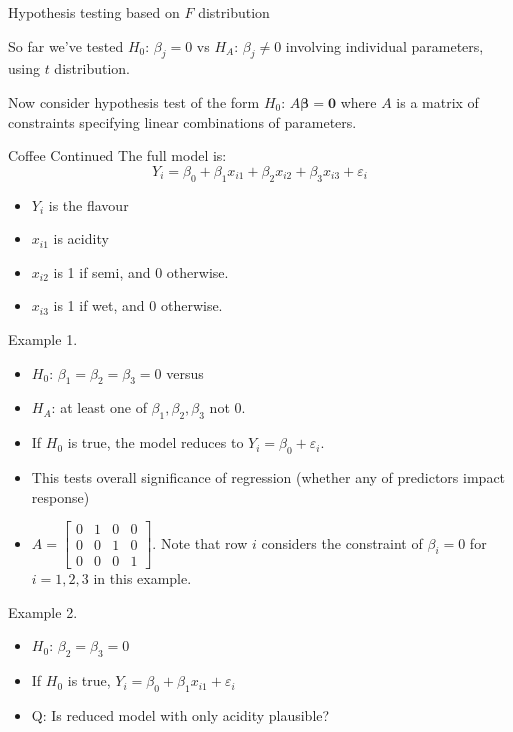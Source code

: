 Hypothesis testing based on $ F $ distribution

So far we've tested $ H_0 $: $ \beta_j=0 $
vs $ H_A $: $ \beta_j\neq 0 $
involving individual parameters,
using $ t $ distribution.

Now consider hypothesis test of the form $ H_0 $: $ A\symbf{\beta}=\symbf{0} $
where $ A $ is a matrix of constraints specifying
linear combinations of parameters.

\begin{Example}{Coffee Continued}{}
    The full model is:
    \[ Y_i=\beta_0+\beta_1x_{i1}+\beta_2x_{i2}+\beta_3x_{i3}+\varepsilon_i \]
    \begin{itemize}
        \item $ Y_i $ is the flavour
        \item $ x_{i1} $ is acidity
        \item $ x_{i2} $ is 1 if semi, and 0 otherwise.
        \item $ x_{i3} $ is 1 if wet, and 0 otherwise.
    \end{itemize}
    Example 1.
    \begin{itemize}
        \item $ H_0 $: $ \beta_1=\beta_2=\beta_3=0 $ versus
        \item $ H_A $: at least one of $ \beta_1,\beta_2,\beta_3 $
              not 0.
        \item If $ H_0 $ is true, the model reduces to
              $ Y_i=\beta_0+\varepsilon_i $.
        \item This tests overall significance of regression
              (whether any of predictors impact response)
        \item $ A=\begin{bmatrix}
                      0 & 1 & 0 & 0 \\
                      0 & 0 & 1 & 0 \\
                      0 & 0 & 0 & 1
                  \end{bmatrix} $. Note that row $ i $ considers
              the constraint of $ \beta_i=0 $ for $ i=1,2,3 $
              in this example.
    \end{itemize}
    Example 2.
    \begin{itemize}
        \item $ H_0 $: $ \beta_2=\beta_3=0 $
        \item If $ H_0 $ is true, $ Y_i=\beta_0+\beta_1x_{i1}+\varepsilon_i $
        \item Q\@: Is reduced model with only acidity plausible?

\end{itemize}
\end{Example}
